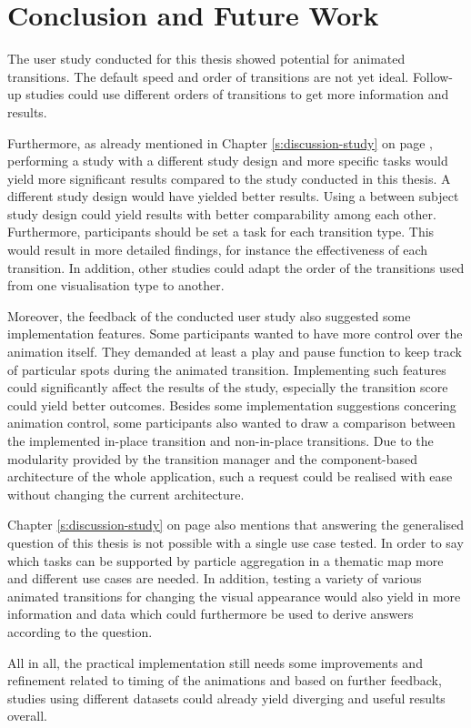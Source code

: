 \section{Conclusion and Future Work}
\label{s:outlook}
\cbstart
The user study conducted for this thesis showed potential for animated transitions. The default speed and order of transitions are not yet ideal. Follow-up studies could use different orders of transitions to get more information and results.

Furthermore, as already mentioned in Chapter \ref{s:discussion-study} on page \pageref{s:discussion-study}, performing a study with a different study design and more specific tasks would yield more significant results compared to the study conducted in this thesis. A different study design would have yielded better results. Using a between subject study design could yield results with better comparability among each other. Furthermore, participants should be set a task for each transition type. This would result in more detailed findings, for instance the effectiveness of each transition. In addition, other studies could adapt the order of the transitions used from one visualisation type to another.

Moreover, the feedback of the conducted user study also suggested some implementation features. Some participants wanted to have more control over the animation itself. They demanded at least a play and pause function to keep track of particular spots during the animated transition. Implementing such features could significantly affect the results of the study, especially the transition score could yield better outcomes. Besides some implementation suggestions concering animation control, some participants also wanted to draw a comparison between the implemented in-place transition and non-in-place transitions. Due to the modularity provided by the transition manager and the component-based architecture of the whole application, such a request could be realised with ease without changing the current architecture.

Chapter \ref{s:discussion-study} on page \pageref{s:discussion-study} also mentions that answering the generalised question of this thesis is not possible with a single use case tested. In order to say which tasks can be supported by particle aggregation in a thematic map more and different use cases are needed. In addition, testing a variety of various animated transitions for changing the visual appearance would also yield in more information and data which could furthermore be used to derive answers according to the question.

All in all, the practical implementation still needs some improvements and refinement related to timing of the animations and based on further feedback, studies using different datasets could already yield diverging and useful results overall.
\cbend
